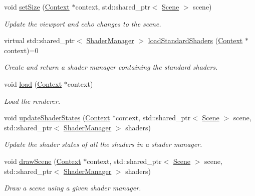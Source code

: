 \begin{DoxyCompactItemize}
\item 
void \hyperlink{class_renderer_a9efd7bd25d602491adbd823b0b7d311c}{set\+Size} (\hyperlink{class_context}{Context} $\ast$context, std\+::shared\+\_\+ptr$<$ \hyperlink{class_scene}{Scene} $>$ scene)
\begin{DoxyCompactList}\small\item\em Update the viewport and echo changes to the scene. \end{DoxyCompactList}\item 
virtual std\+::shared\+\_\+ptr$<$ \hyperlink{class_shader_manager}{Shader\+Manager} $>$ \hyperlink{class_renderer_a18aeed0fc26835778f23a2ff7406446b}{load\+Standard\+Shaders} (\hyperlink{class_context}{Context} $\ast$context)=0
\begin{DoxyCompactList}\small\item\em Create and return a shader manager containing the standard shaders. \end{DoxyCompactList}\item 
void \hyperlink{class_renderer_a14aeed9016bcd66be47862ed3749d7dc}{load} (\hyperlink{class_context}{Context} $\ast$context)
\begin{DoxyCompactList}\small\item\em Load the renderer. \end{DoxyCompactList}\item 
void \hyperlink{class_renderer_aa9ca4685f6e82578dec01db053ceef8d}{update\+Shader\+States} (\hyperlink{class_context}{Context} $\ast$context, std\+::shared\+\_\+ptr$<$ \hyperlink{class_scene}{Scene} $>$ scene, std\+::shared\+\_\+ptr$<$ \hyperlink{class_shader_manager}{Shader\+Manager} $>$ shaders)
\begin{DoxyCompactList}\small\item\em Update the shader states of all the shaders in a shader manager. \end{DoxyCompactList}\item 
void \hyperlink{class_renderer_af3ebba8a1565bca7359944b72f56d719}{draw\+Scene} (\hyperlink{class_context}{Context} $\ast$context, std\+::shared\+\_\+ptr$<$ \hyperlink{class_scene}{Scene} $>$ scene, std\+::shared\+\_\+ptr$<$ \hyperlink{class_shader_manager}{Shader\+Manager} $>$ shaders)
\begin{DoxyCompactList}\small\item\em Draw a scene using a given shader manager. \end{DoxyCompactList}\end{DoxyCompactItemize}
